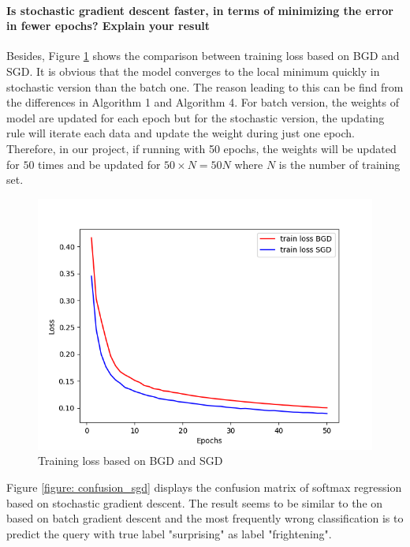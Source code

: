 \documentclass{article}
\begin{document}
\paragraph{Is stochastic gradient descent faster, in terms of minimizing the error
in fewer epochs? Explain your result}
Besides, Figure \ref{figure:bgd_sgd} shows the comparison between training loss based on BGD and SGD. It is obvious that the model converges to the local minimum quickly in stochastic version than the batch one. The reason leading to this can be find from the differences in Algorithm 1 and Algorithm 4. For batch version, the weights of model are updated for each epoch but for the stochastic version, the updating rule will iterate each data and update the weight during just one epoch. Therefore, in our project, if running with 50 epochs, the weights will be updated for $50$ times and be updated for $50\times N= 50N$ where $N$ is the number of training set.
\begin{figure}[ht]
\begin{center}
\includegraphics[scale=0.5]{images/bgd_sgd.png}
\end{center}
\caption{Training loss based on BGD and SGD}
\label{figure:bgd_sgd}
\end{figure}
\par Figure \ref{figure: confusion_sgd} displays the confusion matrix of softmax regression based on stochastic gradient descent. The result seems to be similar to the on based on batch gradient descent and the most frequently wrong classification is to predict the query with true label "surprising" as label "frightening".
\end{document}
